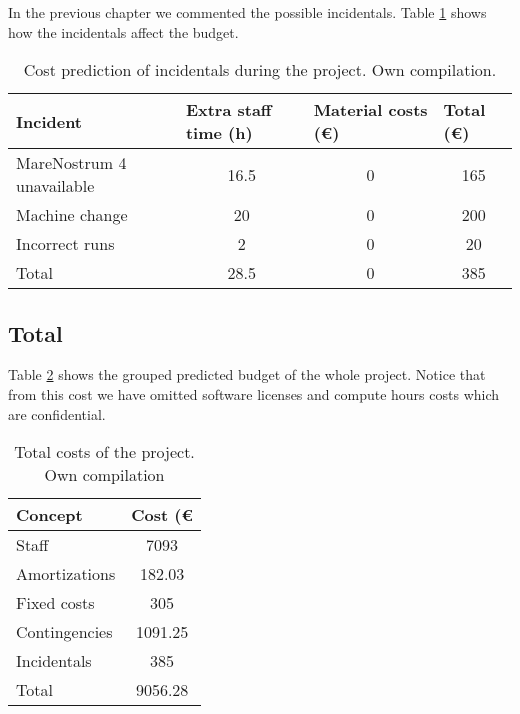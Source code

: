 In the previous chapter we commented the possible incidentals. Table \ref{tab:inc} shows how the incidentals affect the budget.
\begin{table}[htbp!]
\centering
\begin{tabular}{|l|c|c|c|}
\hline
Incident                  & \multicolumn{1}{l|}{Extra staff time (h)} & \multicolumn{1}{l|}{Material costs (\euro)} & \multicolumn{1}{l|}{Total (\euro)} \\ \hline
MareNostrum 4 unavailable & 16.5                                      & 0                                                 & 165                                \\ \hline
Machine change            & 20                                        & 0                                                 & 200                                \\ \hline
Incorrect runs            & 2                                         & 0                                                 & 20                                 \\ \hline
Total                     & 28.5                                      & 0                                                 & 385                                \\ \hline
\end{tabular}
\caption[Cost prediction of incidentals during the project]{Cost prediction of incidentals during the project. Own compilation.}
\label{tab:inc}
\end{table}

\subsection{Total}

Table \ref{tab:tot} shows the grouped predicted budget of the whole project. Notice that from this cost we have omitted software licenses and compute hours costs which are confidential.

\begin{table}[htbp!]
\centering
\begin{tabular}{|l|c|}
\hline
Concept       & \multicolumn{1}{l|}{Cost (\euro} \\ \hline
Staff         & 7093                             \\ \hline
Amortizations & 182.03                           \\ \hline
Fixed costs   & 305                              \\ \hline
Contingencies & 1091.25                          \\ \hline
Incidentals   & 385                              \\ \hline
Total         & 9056.28                          \\ \hline
\end{tabular}
\caption[Total costs of the project]{Total costs of the project. Own compilation}
\label{tab:tot}
\end{table}



